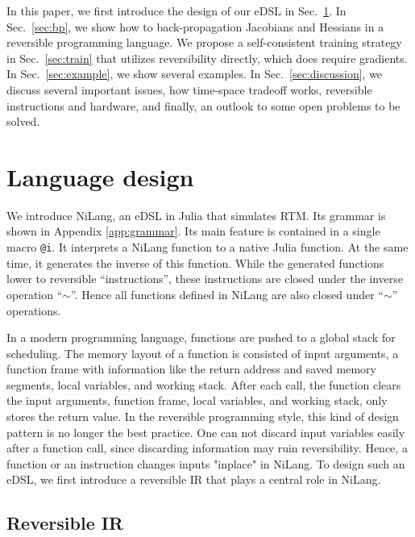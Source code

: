 \documentclass[aps,twocolumn,longbibliography,english,superscriptaddress]{revtex4-1}
\newcommand{\<}{\langle}
\renewcommand{\>}{\rangle}
\newcommand{\Sec}[1]{Sec.~\ref{#1}}
\newcommand{\App}[1]{Appendix \ref{#1}}
\theoremstyle{definition}\newtheorem{definition}{\textit{Definition}}
\begin{document}
    In this paper, we first introduce the design of our eDSL in \Sec{sec:lang}.
    In \Sec{sec:bp}, we show how to back-propagation Jacobians and Hessians in a reversible programming language.
    We propose a self-consistent training strategy in \Sec{sec:train} that utilizes reversibility directly, which does require gradients.
    In \Sec{sec:example}, we show several examples.
    In \Sec{sec:discussion}, we discuss several important issues, how time-space tradeoff works, reversible instructions and hardware, and finally, an outlook to some open problems to be solved.

\section{Language design}\label{sec:lang}
We introduce NiLang, an eDSL in Julia that simulates RTM. Its grammar is shown in \App{app:grammar}.
Its main feature is contained in a single macro \texttt{@i}. It interprets a NiLang function to a native Julia function.
At the same time, it generates the inverse of this function. While the generated functions lower to reversible ``instructions'', these instructions are closed under the inverse operation ``$\sim$''. Hence all functions defined in NiLang are also closed under ``$\sim$'' operations.

    In a modern programming language, functions are pushed to a global stack for scheduling. The memory layout of a function is consisted of input arguments, a function frame with information like the return address and saved memory segments, local variables, and working stack. After each call, the function clears the input arguments, function frame, local variables, and working stack, only stores the return value.
    In the reversible programming style, this kind of design pattern is no longer the best practice. One can not discard input variables easily after a function call, since discarding information may ruin reversibility. Hence, a function or an instruction changes inputs "inplace" in NiLang.
To design such an eDSL, we first introduce a reversible IR that plays a central role in NiLang.

\subsection{Reversible IR}
\end{document}
